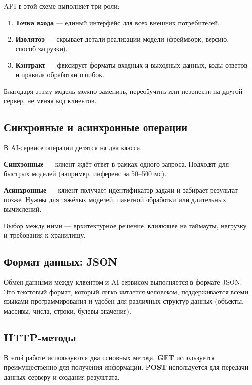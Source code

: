\documentclass[12pt,a4paper]{article}
\begin{document}
API в этой схеме выполняет три роли:

\begin{enumerate}
    \item \textbf{Точка входа} — единый интерфейс для всех внешних потребителей.
    \item \textbf{Изолятор} — скрывает детали реализации модели (фреймворк, версию, способ загрузки).
    \item \textbf{Контракт} — фиксирует форматы входных и выходных данных, коды ответов и правила обработки ошибок.
\end{enumerate}

Благодаря этому модель можно заменить, переобучить или перенести на другой сервер, не меняя код клиентов.

\subsection{Синхронные и асинхронные операции}

В AI-сервисе операции делятся на два класса.

\textbf{Синхронные} — клиент ждёт ответ в рамках одного запроса. Подходят для быстрых моделей (например, инференс за 50--500 мс).

\textbf{Асинхронные} — клиент получает идентификатор задачи и забирает результат позже. Нужны для тяжёлых моделей, пакетной обработки или длительных вычислений.

Выбор между ними — архитектурное решение, влияющее на таймауты, нагрузку и требования к хранилищу.

\subsection{Формат данных: JSON}

Обмен данными между клиентом и AI-сервисом выполняется в формате JSON. Это текстовый формат, который легко читается человеком, поддерживается всеми языками программирования и удобен для различных структур данных (объекты, массивы, числа, строки, булевы значения).

\subsection{HTTP-методы}

В этой работе используются два основных метода. \textbf{GET} используется преимущественно для получения информации. \textbf{POST} используется для передачи данных серверу и создания результата.
\end{document}
